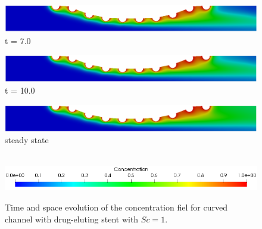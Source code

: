 \begin{figure}[H]
     \begin{minipage}{.50\linewidth}
      \centering
      \includegraphics[scale=0.18]{./02_chaps/cap_solution/figure/conc1_CurvedStrut6.png}\\
      t = 7.0
     \end{minipage}
     \begin{minipage}{.50\linewidth}
     \medskip
      \centering
      \includegraphics[scale=0.18]{./02_chaps/cap_solution/figure/conc1_CurvedStrut7.png}\\
      t = 10.0
     \end{minipage}%
     \begin{minipage}{.50\linewidth}
     \medskip
      \centering
      \includegraphics[scale=0.18]{./02_chaps/cap_solution/figure/conc1_CurvedStrut8.png}\\
      steady state
     \end{minipage}\\[10pt]
      \centering
      \includegraphics[scale=0.5]{./02_chaps/cap_solution/figure/conc1_CurvedStrutScale.png}\\
     \medskip
     \caption{
Time and space evolution of the concentration fiel for curved channel with drug-eluting stent with $Sc=1$.}
     \label{conc field curved stent sc 1}
\end{figure}



